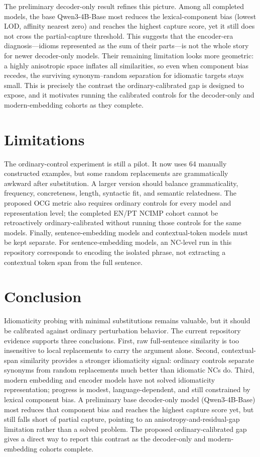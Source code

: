 \documentclass[11pt]{article}
\begin{document}
The preliminary decoder-only result refines this picture. Among all completed models, the base
Qwen3-4B-Base most reduces the lexical-component bias (lowest LOD, affinity nearest zero) and reaches
the highest capture score, yet it still does not cross the partial-capture threshold. This suggests
that the encoder-era diagnosis---idioms represented as the sum of their parts---is not the whole
story for newer decoder-only models. Their remaining limitation looks more geometric: a highly
anisotropic space inflates all similarities, so even when component bias recedes, the surviving
synonym--random separation for idiomatic targets stays small. This is precisely the contrast the
ordinary-calibrated gap is designed to expose, and it motivates running the calibrated controls for
the decoder-only and modern-embedding cohorts as they complete.

\section{Limitations}

The ordinary-control experiment is still a pilot. It now uses 64 manually constructed examples,
but some random replacements are grammatically awkward after substitution. A larger version should
balance grammaticality, frequency, concreteness, length, syntactic fit, and semantic relatedness.
The proposed OCG metric also requires ordinary controls for every model and representation level;
the completed EN/PT NCIMP cohort cannot be retroactively ordinary-calibrated without running those
controls for the same models. Finally, sentence-embedding models and contextual-token models must
be kept separate. For sentence-embedding models, an NC-level run in this repository corresponds to
encoding the isolated phrase, not extracting a contextual token span from the full sentence.

\section{Conclusion}

Idiomaticity probing with minimal substitutions remains valuable, but it should be calibrated
against ordinary perturbation behavior. The current repository evidence supports three conclusions.
First, raw full-sentence similarity is too insensitive to local replacements to carry the argument
alone. Second, contextual-span similarity provides a stronger idiomaticity signal: ordinary controls
separate synonyms from random replacements much better than idiomatic NCs do. Third, modern
embedding and encoder models have not solved idiomaticity representation; progress is modest,
language-dependent, and still constrained by lexical component bias. A preliminary base
decoder-only model (Qwen3-4B-Base) most reduces that component bias and reaches the highest capture
score yet, but still falls short of partial capture, pointing to an anisotropy-and-residual-gap
limitation rather than a solved problem. The proposed ordinary-calibrated gap gives a direct way to
report this contrast as the decoder-only and modern-embedding cohorts complete.
\end{document}
